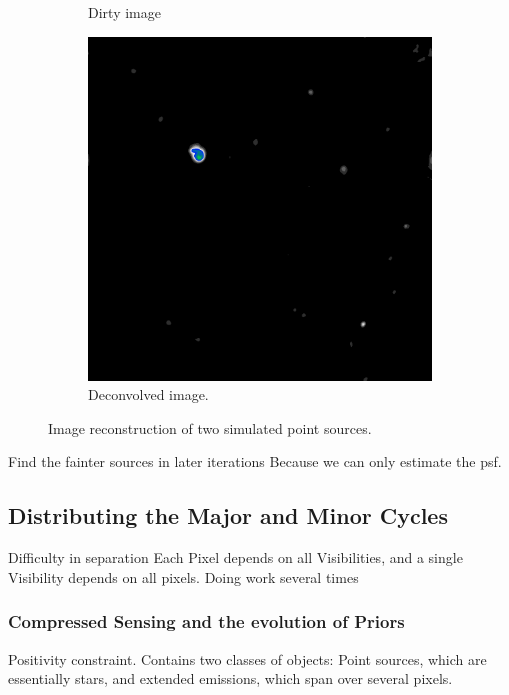 \begin{figure}[h]
\begin{subfigure}[b]{0.3\linewidth}
		\caption{Dirty image}
		\label{results:points:tclean}
	\end{subfigure}
	\begin{subfigure}[b]{0.3\linewidth}
		\includegraphics[width=\linewidth]{./chapters/01.intro/mk2/clean.png}
		\caption{Deconvolved image.}
		\label{results:points:tclean}
	\end{subfigure}
	
	
	\caption{Image reconstruction of two simulated point sources.}
	\label{results:points}
\end{figure}
Find the fainter sources in later iterations
Because we can only estimate the psf.



\subsection{Distributing the Major and Minor Cycles}
Difficulty in separation
Each Pixel depends on all Visibilities, and a single Visibility depends on all pixels.
Doing work several times

\subsubsection{Compressed Sensing and the evolution of Priors}
Positivity constraint.
Contains two classes of objects: Point sources, which are essentially stars, and extended emissions, which span over several pixels.


